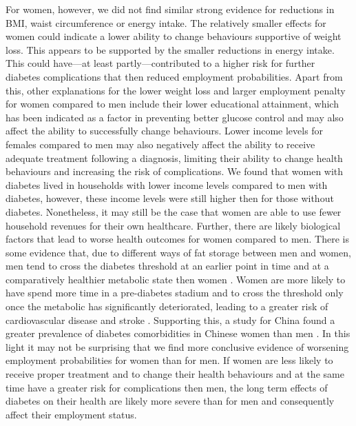 For women, however, we did not find similar strong evidence for reductions in \ac{BMI}, waist circumference or energy intake. The relatively smaller effects for women could indicate a lower ability to change behaviours supportive of weight loss. This appears to be supported by the smaller reductions in energy intake. This could have---at least partly---contributed to a higher risk for further diabetes complications that then reduced employment probabilities. Apart from this, other explanations for the lower weight loss and larger employment penalty for women compared to men include their lower educational attainment, which has been indicated as a factor in preventing better glucose control \autocite{Luo2015} and may also affect the ability to successfully change behaviours. Lower income levels for females compared to men may also negatively affect the ability to receive adequate treatment following a diagnosis, limiting their ability to change health behaviours \autocite{Luo2015} and increasing the risk of complications. We found that women with diabetes lived in households with lower income levels compared to men with diabetes, however, these income levels were still higher then for those without diabetes. Nonetheless, it may still be the case that women are able to use fewer household revenues for their own healthcare. Further, there are likely biological factors that lead to worse health outcomes for women compared to men. There is some evidence that, due to different ways of fat storage between men and women, men tend to cross the diabetes threshold at an earlier point in time and at a comparatively healthier metabolic state then women \parencite{Peters2015,Peters2014a,Peters2014}. Women are more likely to have spend more time in a pre-diabetes stadium \parencite{Bertram2010} and to cross the threshold only once the metabolic has significantly deteriorated, leading to a greater risk of cardiovascular disease and stroke \parencite{Peters2015}. Supporting this, a study for China found a greater prevalence of diabetes comorbidities in Chinese women than men \autocite{Liu2010}. In this light it may not be surprising that we find more conclusive evidence of worsening employment probabilities for women than for men. If women are less likely to receive proper treatment and to change their health behaviours and at the same time have a greater risk for complications then men, the long term effects of diabetes on their health are likely more severe than for men and consequently affect their employment status.

